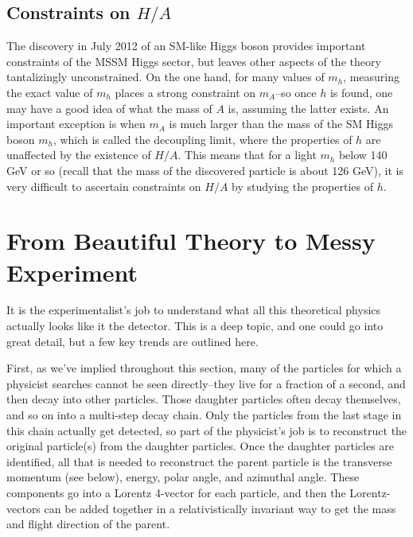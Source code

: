 \subsection{Constraints on $H/A$}
The discovery in July 2012 of an SM-like Higgs boson provides important constraints of the MSSM Higgs sector, but leaves other aspects of the theory tantalizingly unconstrained.  On the one hand, for many values of $m_h$, measuring the exact value of $m_h$ places a strong constraint on $m_A$--so once $h$ is found, one may have a good idea of what the mass of $A$ is, assuming the latter exists.  An important exception is when $m_A$ is much larger than the mass of the SM Higgs boson $m_h$, which is called the decoupling limit, where the properties of $h$ are unaffected by the existence of $H/A$.  This means that for a light $m_h$ below 140 GeV or so (recall that the mass of the discovered particle is about 126 GeV), it is very difficult to ascertain constraints on $H/A$ by studying the properties of $h$.  


 


\section{From Beautiful Theory to Messy Experiment}

It is the experimentalist's job to understand what all this theoretical physics actually looks like it the detector.  This is a deep topic, and one could go into great detail, but a few key trends are outlined here.

First, as we've implied throughout this section, many of the particles for which a physicist searches cannot be seen directly--they live for a fraction of a second, and then decay into other particles.  Those daughter particles often decay themselves, and so on into a  multi-step decay chain.  Only the particles from the last stage in this chain actually get detected, so part of the physicist's job is to reconstruct the original particle(s) from the daughter particles.  Once the daughter particles are identified, all that is needed to reconstruct the parent particle is the transverse momentum (see below), energy, polar angle, and azimuthal angle.  These components go into a Lorentz 4-vector for each particle, and then the Lorentz-vectors can be added together in a relativistically invariant way to get the mass and flight direction of the parent.

